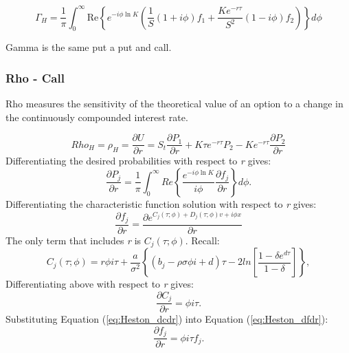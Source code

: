 \documentclass[a4paper]{article}
\begin{document}
\[ \Gamma_H=\frac{1}{\pi} \int_0^\infty \mbox{Re}\left\{e^{-i\phi \ln K} \left(\frac{1}{S}(1+i\phi)f_1+\frac{Ke^{-r\tau}}{S^2}(1-i\phi) f_2\right)\right\}d\phi\]

Gamma is the same put a put and call.



\newpage



\subsubsection*{Rho - Call}

Rho measures the sensitivity of the theoretical value of an option to a change in the continuously compounded interest rate.

\begin{equation}
	Rho_H = \rho_H = \frac{\partial U}{\partial r} = S_t\frac{\partial P_1}{\partial r} + K\tau e^{-r\tau}P_2 - Ke^{-r\tau}\frac{\partial P_2}{\partial r}
	\label{eq:Heston_rho_start}
\end{equation}
Differentiating the desired probabilities with respect to \textit{r} gives:
\begin{equation}
	\frac{\partial P_j}{\partial r} = \frac{1}{\pi}\int_0^{\infty} Re \left\{ \frac{e^{-i\phi \ln K}}{i\phi}\frac{\partial f_j}{\partial r} \right\} d\phi.
	\label{eq:Heston_dpdr}
\end{equation}
Differentiating the characteristic function solution with respect to \textit{r} gives:
\begin{equation}
\frac{\partial f_j}{\partial r} = \frac{\partial e^{C_j(\tau;\phi) + D_j(\tau;\phi)v + i\phi x}}{\partial r}
	\label{eq:Heston_dfdr}
\end{equation}
The only term that includes \textit{r} is $C_j(\tau;\phi)$. Recall: 
\begin{equation*}
	C_j(\tau;\phi) = r\phi i\tau + \frac{a}{\sigma^2} \left\{(b_j - \rho \sigma \phi i + d) \tau - 2ln\left[ \frac{1 - \delta e^{d \tau}}{1 - \delta} \right] \right\},
	\label{eq:Heston_C}
\end{equation*}
Differentiating above with respect to \textit{r} gives:
\begin{equation}
	\frac{\partial C_j}{\partial r} = \phi i \tau.
	\label{eq:Heston_dcdr}
\end{equation}
Substituting Equation (\ref{eq:Heston_dcdr}) into Equation (\ref{eq:Heston_dfdr}):
\begin{equation}
	\frac{\partial f_j}{\partial r} = \phi i \tau f_j.
	\label{eq:Heston_dfdr2}
\end{equation}
\end{document}
